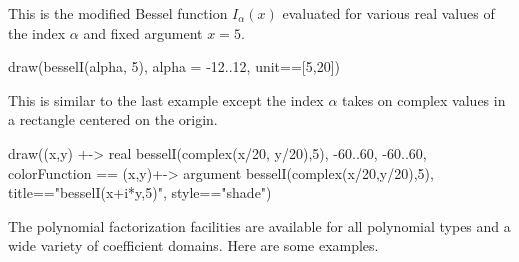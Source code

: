 {{{{{{{{{{{\begin{psXtc}
\begin{xtccomment}
This is the modified Bessel function
$I_\alpha (x)$
evaluated for various real values of the index $\alpha$
and fixed argument $x = 5$.
\end{xtccomment}
\begin{spadsrc}
draw(besselI(alpha, 5), alpha = -12..12, unit==[5,20])
\end{spadsrc}
\end{psXtc}

\begin{psXtc}
\begin{xtccomment}
This is similar to the last example
except the index $\alpha$
takes on complex values in a  rectangle  centered on the origin.
\end{xtccomment}
\begin{spadsrc}
draw((x,y) +-> real besselI(complex(x/20, y/20),5), -60..60, -60..60, colorFunction == (x,y)+-> argument besselI(complex(x/20,y/20),5), title=="besselI(x+i*y,5)", style=="shade")
\end{spadsrc}
\end{psXtc}

%
The \Language{} polynomial factorization
facilities are available for all polynomial types and a wide variety of
coefficient domains.
Here are some examples.


}}}}}}}}}}}
